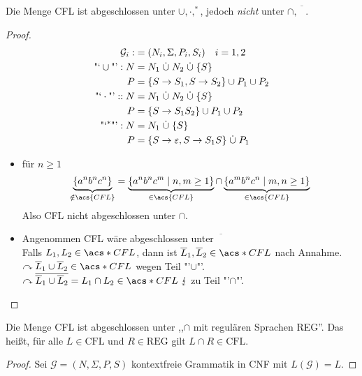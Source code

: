 {\begin{Satz} %
  \label{thm:cfl-closed-reg-intersect}
	Die Menge \acs{CFL} ist abgeschlossen unter $\cup, \cdot, ^*$, jedoch \emph{nicht} unter $\cap, \overline{\phantom{A}}$.
\end{Satz}
\begin{proof}
	\begin{align*}
		\mathcal{G}_i :&= (N_i, \Sigma,P_i,S_i) \quad i=1,2\\
		\text{"`}\cup\text{"'}: N &= N_1\dotcup N_2\dotcup\{S\}\\
		P &= \{S\->S_1, S\->S_2 \} \cup P_1\cup P_2\\
		\text{"`}\cdot\text{"'}:: N &= N_1\dotcup N_2\dotcup\{S\}\\
		P &= \{ S\->S_1S_2 \} \cup P_1\cup P_2\\
		\text{"`}^*\text{"'}: N &= N_1 \dotcup \{S\}\\
		P &= \{ S\->\Eps, S\-> S_1S \} \dotcup P_1
	\end{align*}
	\begin{itemize}
	\item für $n\geq 1$
		\[ \underbrace{\{a^nb^nc^n\}}_{\notin \acs{CFL}} = \underbrace{\{a^nb^nc^m \mid n,m\geq 1 \}}_{\in \acs{CFL}} \cap \underbrace{\{a^mb^nc^n \mid m,n\geq 1 \}}_{\in \acs{CFL}} \]
		Also \ac{CFL} nicht abgeschlossen unter $\cap$.
	\item Angenommen CFL wäre abgeschlossen unter $\overline{\phantom{X}}$\\
		Falls $L_1,L_2\in \acs*{CFL}$, dann ist $\overline{L}_1,\overline{L}_2\in\acs*{CFL}$ nach Annahme.\\
		$\curvearrowright \overline{L}_1\cup \overline{L}_2\in\acs*{CFL}$ wegen Teil "'$\cup$"'.\\
		$\curvearrowright \overline{\overline{L}_1\cup \overline{L}_2} = L_1\cap L_2\in\acs*{CFL}\ \lightning$ zu Teil "'$\cap$"'. \qedhere
	\end{itemize}
\end{proof}

\begin{Satz} %
	Die Menge \ac{CFL} ist abgeschlossen unter ,,$\cap$ mit regulären Sprachen REG''.
  Das heißt, für alle $L \in \mathrm{CFL}$ und $R \in \mathrm{REG}$ gilt $L \cap R \in \mathrm{CFL}$.
\end{Satz}
\begin{proof}
  Sei $\mathcal{G} = (N, \Sigma, P, S)$ kontextfreie Grammatik in CNF mit $L(\mathcal{G}) = L$.


\end{proof}}
